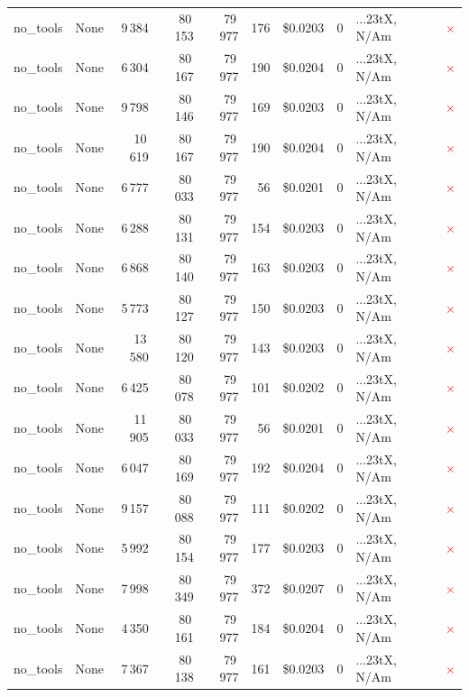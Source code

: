 \documentclass[a4paper,11pt]{article}
\begin{document}
\begin{table}[H]
{\begin{tabular}{l r r r r r r r l c}
no\_tools & None & 9\,384 & 80\,153 & 79\,977 & 176 & \$0.0203 & 0 & ...23tX, N/Am & \textcolor{red}{\(\times\)} \\
no\_tools & None & 6\,304 & 80\,167 & 79\,977 & 190 & \$0.0204 & 0 & ...23tX, N/Am & \textcolor{red}{\(\times\)} \\
no\_tools & None & 9\,798 & 80\,146 & 79\,977 & 169 & \$0.0203 & 0 & ...23tX, N/Am & \textcolor{red}{\(\times\)} \\
no\_tools & None & 10\,619 & 80\,167 & 79\,977 & 190 & \$0.0204 & 0 & ...23tX, N/Am & \textcolor{red}{\(\times\)} \\
no\_tools & None & 6\,777 & 80\,033 & 79\,977 & 56 & \$0.0201 & 0 & ...23tX, N/Am & \textcolor{red}{\(\times\)} \\
no\_tools & None & 6\,288 & 80\,131 & 79\,977 & 154 & \$0.0203 & 0 & ...23tX, N/Am & \textcolor{red}{\(\times\)} \\
no\_tools & None & 6\,868 & 80\,140 & 79\,977 & 163 & \$0.0203 & 0 & ...23tX, N/Am & \textcolor{red}{\(\times\)} \\
no\_tools & None & 5\,773 & 80\,127 & 79\,977 & 150 & \$0.0203 & 0 & ...23tX, N/Am & \textcolor{red}{\(\times\)} \\
no\_tools & None & 13\,580 & 80\,120 & 79\,977 & 143 & \$0.0203 & 0 & ...23tX, N/Am & \textcolor{red}{\(\times\)} \\
no\_tools & None & 6\,425 & 80\,078 & 79\,977 & 101 & \$0.0202 & 0 & ...23tX, N/Am & \textcolor{red}{\(\times\)} \\
no\_tools & None & 11\,905 & 80\,033 & 79\,977 & 56 & \$0.0201 & 0 & ...23tX, N/Am & \textcolor{red}{\(\times\)} \\
no\_tools & None & 6\,047 & 80\,169 & 79\,977 & 192 & \$0.0204 & 0 & ...23tX, N/Am & \textcolor{red}{\(\times\)} \\
no\_tools & None & 9\,157 & 80\,088 & 79\,977 & 111 & \$0.0202 & 0 & ...23tX, N/Am & \textcolor{red}{\(\times\)} \\
no\_tools & None & 5\,992 & 80\,154 & 79\,977 & 177 & \$0.0203 & 0 & ...23tX, N/Am & \textcolor{red}{\(\times\)} \\
no\_tools & None & 7\,998 & 80\,349 & 79\,977 & 372 & \$0.0207 & 0 & ...23tX, N/Am & \textcolor{red}{\(\times\)} \\
no\_tools & None & 4\,350 & 80\,161 & 79\,977 & 184 & \$0.0204 & 0 & ...23tX, N/Am & \textcolor{red}{\(\times\)} \\
no\_tools & None & 7\,367 & 80\,138 & 79\,977 & 161 & \$0.0203 & 0 & ...23tX, N/Am & \textcolor{red}{\(\times\)} \\

\end{tabular}}
\end{table}
\end{document}
